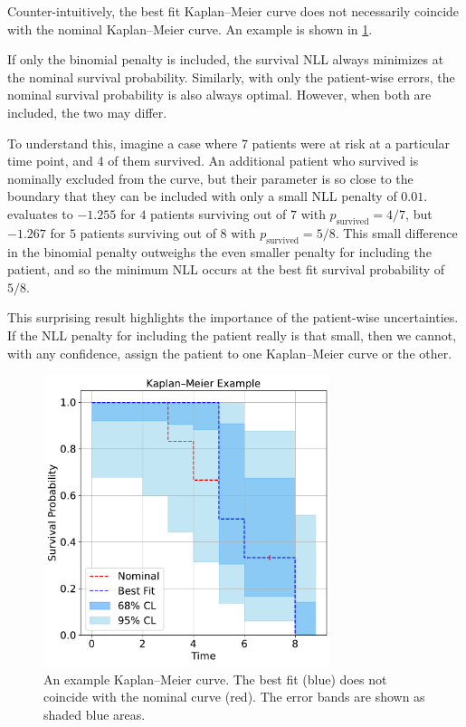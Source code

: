 \documentclass[article]{jss}
\newcommand{\KM}{Kaplan--Meier} %
\begin{document}
Counter-intuitively, the best fit \KM{} curve does not necessarily coincide with the nominal \KM{} curve.  An example is shown in \cref{fig:best-fit-vs-nominal}.

If only the binomial penalty is included, the survival NLL always minimizes at the nominal survival probability.  Similarly, with only the patient-wise errors, the nominal survival probability is also always optimal.  However, when both are included, the two may differ.

To understand this, imagine a case where 7 patients were at risk at a particular time point, and 4 of them survived.  An additional patient who survived is nominally excluded from the curve, but their parameter is so close to the boundary that they can be included with only a small NLL penalty of \(0.01\)\@.   evaluates to \(-1.255\) for \(4\) patients surviving out of \(7\) with \(p_\text{survived}=4/7\), but \(-1.267\) for \(5\) patients surviving out of \(8\) with \(p_\text{survived}=5/8\).  This small difference in the binomial penalty outweighs the even smaller penalty for including the patient, and so the minimum NLL occurs at the best fit survival probability of \(5/8\).

This surprising result highlights the importance of the patient-wise uncertainties.  If the NLL penalty for including the patient really is that small, then we cannot, with any confidence, assign the patient to one \KM{} curve or the other.

\begin{figure}
  \centering
  \includegraphics[width=0.75\textwidth]{km_example.pdf}
  \caption{\label{fig:best-fit-vs-nominal} An example \KM{} curve.  The best fit (blue) does not coincide with the nominal curve (red).  The error bands are shown as shaded blue areas.}
\end{figure}
\end{document}
